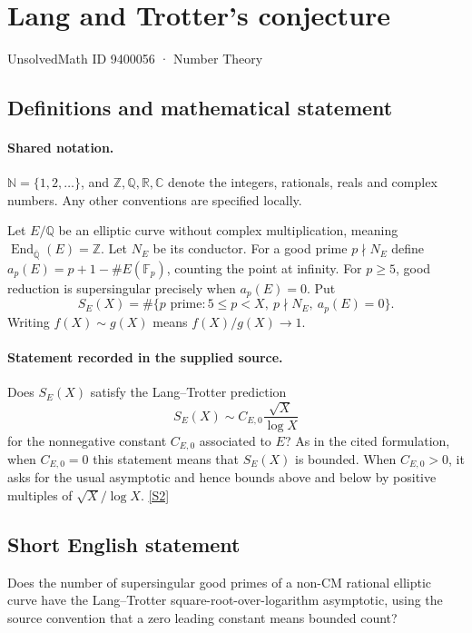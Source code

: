 \documentclass[11pt]{article}
\newcommand{\sref}[2]{\hyperlink{source:#1:#2}{[S#2]}}
\begin{document}
\setcounter{section}{9400055}
\section{Lang and Trotter's conjecture}\label{9400056}
{\small\sffamily UnsolvedMath ID 9400056 · Number Theory}
\subsection{Definitions and mathematical statement}

\paragraph{Shared notation.}$\mathbb N=\{1,2,\ldots\}$, and $\mathbb Z,\mathbb Q,\mathbb R,\mathbb C$ denote the integers, rationals, reals and complex numbers. Any other conventions are specified locally.


Let $E/\mathbb Q$ be an elliptic curve without complex multiplication, meaning $\operatorname{End}_{\overline{\mathbb Q}}(E)=\mathbb Z$. Let $N_E$ be its conductor. For a good prime $p\nmid N_E$ define $a_p(E)=p+1-\#E(\mathbb F_p)$, counting the point at infinity. For $p\ge5$, good reduction is supersingular precisely when $a_p(E)=0$. Put
\[
S_E(X)=\#\{p\text{ prime}:5\le p<X,\ p\nmid N_E,\ a_p(E)=0\}.
\]
Writing $f(X)\sim g(X)$ means $f(X)/g(X)\to1$.
\paragraph{Statement recorded in the supplied source.}
Does $S_E(X)$ satisfy the Lang--Trotter prediction
\[S_E(X)\sim C_{E,0}\frac{\sqrt X}{\log X}\]
for the nonnegative constant $C_{E,0}$ associated to $E$? As in the cited formulation, when $C_{E,0}=0$ this statement means that $S_E(X)$ is bounded. When $C_{E,0}>0$, it asks for the usual asymptotic and hence bounds above and below by positive multiples of $\sqrt X/\log X$. \sref{9400056}{2}
\subsection{Short English statement}
Does the number of supersingular good primes of a non-CM rational elliptic curve have the Lang--Trotter square-root-over-logarithm asymptotic, using the source convention that a zero leading constant means bounded count?
\end{document}
